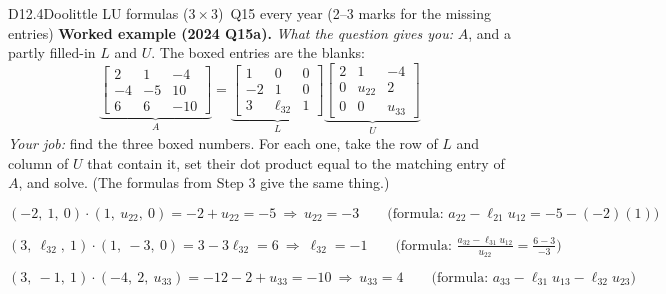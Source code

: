 \begin{deriv}{D12.4}{Doolittle LU formulas (3\,$\times$\,3)}{\sthree\ Q15 every year (2--3 marks for the missing entries)}
\textbf{Worked example (2024 Q15a).} \emph{What the question gives you:} $A$, and a partly filled-in $L$ and $U$. The boxed entries are the blanks:
\[\underbrace{\begin{bmatrix}2&1&-4\\-4&-5&10\\6&6&-10\end{bmatrix}}_{A}=\underbrace{\begin{bmatrix}1&0&0\\-2&1&0\\3&\boxed{\ell_{32}}&1\end{bmatrix}}_{L}\underbrace{\begin{bmatrix}2&1&-4\\0&\boxed{u_{22}}&2\\0&0&\boxed{u_{33}}\end{bmatrix}}_{U}\]
\emph{Your job:} find the three boxed numbers. For each one, take the row of $L$ and column of $U$ that contain it, set their dot product equal to the matching entry of $A$, and solve. (The formulas from Step 3 give the same thing.)

\[(-2,\ 1,\ 0)\cdot(1,\ u_{22},\ 0)=-2+u_{22}=-5\ \Rightarrow\ u_{22}=-3\qquad\Big(\text{formula: }a_{22}-\ell_{21}u_{12}=-5-(-2)(1)\Big)\]

\[(3,\ \ell_{32},\ 1)\cdot(1,\ -3,\ 0)=3-3\ell_{32}=6\ \Rightarrow\ \ell_{32}=-1\qquad\Big(\text{formula: }\tfrac{a_{32}-\ell_{31}u_{12}}{u_{22}}=\tfrac{6-3}{-3}\Big)\]

\[(3,\ -1,\ 1)\cdot(-4,\ 2,\ u_{33})=-12-2+u_{33}=-10\ \Rightarrow\ u_{33}=4\qquad\Big(\text{formula: }a_{33}-\ell_{31}u_{13}-\ell_{32}u_{23}\Big)\]

\end{deriv}

